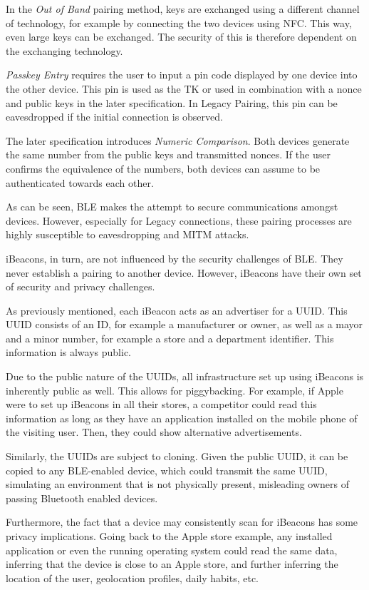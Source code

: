 In the \textit{Out of Band} pairing method, keys are exchanged using a different channel of technology, for example by connecting the two devices using \ac{NFC}. This way, even large keys can be exchanged. The security of this is therefore dependent on the exchanging technology.

\textit{Passkey Entry} requires the user to input a pin code displayed by one device into the other device. This pin is used as the \ac{TK} or used in combination with a nonce and public keys in the later specification. In Legacy Pairing, this pin can be eavesdropped if the initial connection is observed.

The later specification introduces \textit{Numeric Comparison}. Both devices generate the same number from the public keys and transmitted nonces. If the user confirms the equivalence of the numbers, both devices can assume to be authenticated towards each other. \cite{digikey}

As can be seen, \ac{BLE} makes the attempt to secure communications amongst devices. However, especially for Legacy connections, these pairing processes are highly susceptible to eavesdropping and MITM attacks.

iBeacons, in turn, are not influenced by the security challenges of \ac{BLE}. They never establish a pairing to another device. However, iBeacons have their own set of security and privacy challenges.

As previously mentioned, each iBeacon acts as an advertiser for a UUID. This UUID consists of an ID, for example a manufacturer or owner, as well as a mayor and a minor number, for example a store and a department identifier. This information is always public.

Due to the public nature of the UUIDs, all infrastructure set up using iBeacons is inherently public as well. This allows for piggybacking. For example, if Apple were to set up iBeacons in all their stores, a competitor could read this information as long as they have an application installed on the mobile phone of the visiting user. Then, they could show alternative advertisements.

Similarly, the UUIDs are subject to cloning. Given the public UUID, it can be copied to any \ac{BLE}-enabled device, which could transmit the same UUID, simulating an environment that is not physically present, misleading owners of passing Bluetooth enabled devices.

Furthermore, the fact that a device may consistently scan for iBeacons has some privacy implications. Going back to the Apple store example, any installed application or even the running operating system could read the same data, inferring that the device is close to an Apple store, and further inferring the location of the user, geolocation profiles, daily habits, etc.

